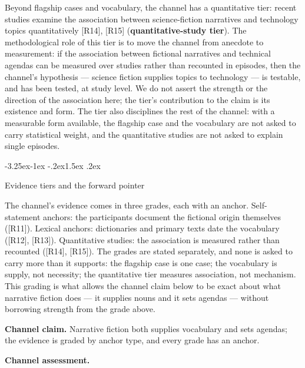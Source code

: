 \documentclass[11pt,a4paper]{article}
\makeatletter
\renewcommand\subsection{\@startsection{subsection}{2}{\z@}%
  {-3.25ex\@plus -1ex \@minus -.2ex}{1.5ex \@plus .2ex}%
  {\normalfont\large\bfseries\raggedright}}
\makeatother
\begin{document}
Beyond flagship cases and vocabulary, the channel has a quantitative tier: recent studies examine the association between science-fiction narratives and technology topics quantitatively [R14], [R15] (\textbf{quantitative-study tier}). The methodological role of this tier is to move the channel from anecdote to measurement: if the association between fictional narratives and technical agendas can be measured over studies rather than recounted in episodes, then the channel's hypothesis — science fiction supplies topics to technology — is testable, and has been tested, at study level. We do not assert the strength or the direction of the association here; the tier's contribution to the claim is its existence and form. The tier also disciplines the rest of the channel: with a measurable form available, the flagship case and the vocabulary are not asked to carry statistical weight, and the quantitative studies are not asked to explain single episodes.

\subsection{Evidence tiers and the forward pointer}

The channel's evidence comes in three grades, each with an anchor. Self-statement anchors: the participants document the fictional origin themselves ([R11]). Lexical anchors: dictionaries and primary texts date the vocabulary ([R12], [R13]). Quantitative studies: the association is measured rather than recounted ([R14], [R15]). The grades are stated separately, and none is asked to carry more than it supports: the flagship case is one case; the vocabulary is supply, not necessity; the quantitative tier measures association, not mechanism. This grading is what allows the channel claim below to be exact about what narrative fiction does — it supplies nouns and it sets agendas — without borrowing strength from the grade above.

\textbf{Channel claim.} Narrative fiction both supplies vocabulary and sets agendas; the evidence is graded by anchor type, and every grade has an anchor.

\textbf{Channel assessment.}
\end{document}
